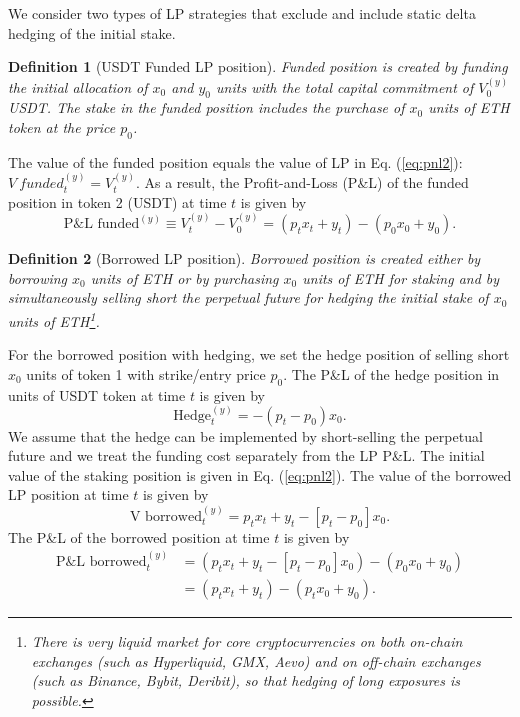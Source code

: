 \documentclass[pdftex,11pt,a4paper] {article}
\newtheorem{definition}{Definition}[section]
\begin{document}
We consider two types of LP strategies that exclude and include static delta
hedging of the initial stake.

\begin{definition}[USDT Funded LP position]
Funded position is created by funding the initial allocation of $x_{0}$ and $%
y_{0}$ units with the total capital commitment of $V^{(y)}_{0}$ USDT.
The stake in the funded position includes the purchase of $x_{0}$ units of ETH
token at the price $p_{0}$.
\end{definition}

The value of the funded position equals the value of LP in Eq. (\ref{eq:pnl2}): $V \ funded^{(y)}_{t} = V^{(y)}_{t}$. As a result, the
Profit-and-Loss (P\&L) of the funded position in token 2 (USDT) at time $t$
is given by
\begin{equation}  \label{eq:pnl_funded}
\text{P\&L funded}^{(y)} \equiv V^{(y)}_{t} - V^{(y)}_{0} = \left(p_{t} x_{t} +
y_{t}\right) - \left(p_{0}x_{0} + y_{0}\right).
\end{equation}

\begin{definition}[Borrowed LP position]
Borrowed position is created either by borrowing $x_{0}$ units of ETH or by
purchasing $x_{0}$ units of ETH for staking and by simultaneously selling
short the perpetual future for hedging the initial stake of $x_{0}$ units of
ETH\footnote{%
There is very liquid market for core cryptocurrencies on both on-chain
exchanges (such as Hyperliquid, GMX, Aevo) and on off-chain exchanges (such
as Binance, Bybit, Deribit), so that hedging of long exposures is possible.}.
\end{definition}

For the borrowed position with hedging, we set the hedge position of selling
short $x_{0}$ units of token 1 with strike/entry price $p_{0}$. The P\&L of
the hedge position in units of USDT token at time $t$ is given by
\begin{equation}  \label{eq:pnl4}
\text{Hedge}^{(y)}_{t}=-\left( p_{t} - p_{0}\right) x_{0}.
\end{equation}
We assume that the hedge can be implemented by short-selling the perpetual
future and we treat the funding cost separately from the LP P\&L. The
initial value of the staking position is given in Eq. (\ref{eq:pnl2}). The
value of the borrowed LP position at time $t$ is given by
\begin{equation}  \label{eq:v_borrowed}
\text{V borrowed}^{(y)}_{t} = p_{t} x_{t} + y_{t} -\left[p_{t}-p_{0}\right]x_{0}.
\end{equation}
The P\&L of the borrowed position at time $t$ is given by
\begin{equation}  \label{eq:pnl_borrowed}
\begin{split}
\text{P\&L borrowed}^{(y)}_{t} & = \left(p_{t} x_{t} + y_{t} -\left[p_{t}-p_{0}%
\right]x_{0}\right) - \left(p_{0}x_{0} + y_{0}\right) \\
& = \left(p_{t} x_{t} + y_{t} \right) - \left(p_{t} x_{0} + y_{0}\right).
\end{split}%
\end{equation}
\end{document}

